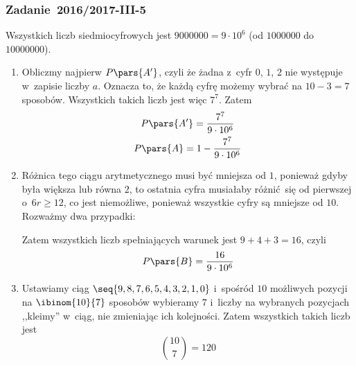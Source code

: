 \subsubsection*{Zadanie~2016/2017-III-5}
Wszystkich liczb siedmiocyfrowych jest \(9000000 = 9 \cdot 10^6\) (od \(1000000\) do \(10000000\)).
\begin{enumerate}[label={\Alph*:}]
    \item Obliczmy najpierw \(P\pars{A'}\), czyli że żadna z~cyfr \(0\), \(1\), \(2\) nie występuje w~zapisie liczby \(a\). Oznacza to, że każdą cyfrę możemy wybrać na \(10 - 3 = 7\) sposobów. Wszystkich takich liczb jest więc \(7^7\). Zatem
        \begin{gather*}
            P\pars{A'}
            = \frac{7^7}{9 \cdot 10^6}\\
            P\pars{A}
            = 1 - \frac{7^7}{9 \cdot 10^6}
        \end{gather*}
    \item Różnica tego ciągu arytmetycznego musi być mniejsza od \(1\), ponieważ gdyby była większa lub równa \(2\), to ostatnia cyfra musiałaby różnić się od pierwszej o~\(6r \geq 12\), co jest niemożliwe, ponieważ wszystkie cyfry są mniejsze od \(10\). Rozważmy dwa przypadki:
        Zatem wszystkich liczb spełniających warunek jest \(9 + 4 + 3 = 16\), czyli
        \begin{equation*}
            P\pars{B}
            = \frac{16}{9 \cdot 10^6}
        \end{equation*}
    \item Ustawiamy ciąg \(\seq{9, 8, 7, 6, 5, 4, 3, 2, 1, 0}\) i~spośród \(10\) możliwych pozycji na \(\ibinom{10}{7}\) sposobów wybieramy \(7\) i~liczby na wybranych pozycjach ,,kleimy'' w~ciąg, nie zmieniając ich kolejności. Zatem wszystkich takich liczb jest
        \begin{equation*}
            \binom{10}{7} = 120
        \end{equation*}
\end{enumerate}

